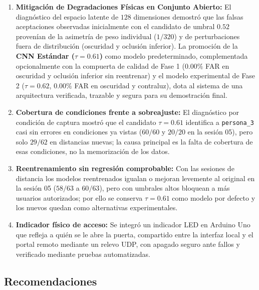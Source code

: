 \documentclass{article}
\begin{document}
\begin{enumerate}
    \item \textbf{Mitigación de Degradaciones Físicas en Conjunto Abierto:} El diagnóstico del espacio latente de $128$ dimensiones demostró que las falsas aceptaciones observadas inicialmente con el candidato de umbral $0.52$ provenían de la asimetría de peso individual ($1/320$) y de perturbaciones fuera de distribución (oscuridad y oclusión inferior). La promoción de la \textbf{CNN Estándar ($\tau = 0.61$)} como modelo predeterminado, complementada opcionalmente con la compuerta de calidad de Fase 1 ($0.00\%$ FAR en oscuridad y oclusión inferior sin reentrenar) y el modelo experimental de Fase 2 ($\tau = 0.62$, $0.00\%$ FAR en oscuridad y contraluz), dota al sistema de una arquitectura verificada, trazable y segura para su demostración final.
    \item \textbf{Cobertura de condiciones frente a sobreajuste:} El diagnóstico por condición de captura mostró que el candidato $\tau = 0.61$ identifica a \texttt{persona\_3} casi sin errores en condiciones ya vistas ($60/60$ y $20/20$ en la sesión 05), pero solo $29/62$ en distancias nuevas; la causa principal es la falta de cobertura de esas condiciones, no la memorización de los datos.
    \item \textbf{Reentrenamiento sin regresión comprobable:} Con las sesiones de distancia los modelos reentrenados igualan o mejoran levemente al original en la sesión 05 ($58/63$ a $60/63$), pero con umbrales altos bloquean a más usuarios autorizados; por ello se conserva $\tau = 0.61$ como modelo por defecto y los nuevos quedan como alternativas experimentales.
    \item \textbf{Indicador físico de acceso:} Se integró un indicador LED en Arduino Uno que refleja a quién se le abre la puerta, compartido entre la interfaz local y el portal remoto mediante un relevo UDP, con apagado seguro ante fallos y verificado mediante pruebas automatizadas.
\end{enumerate}

\subsection{Recomendaciones}
\end{document}
